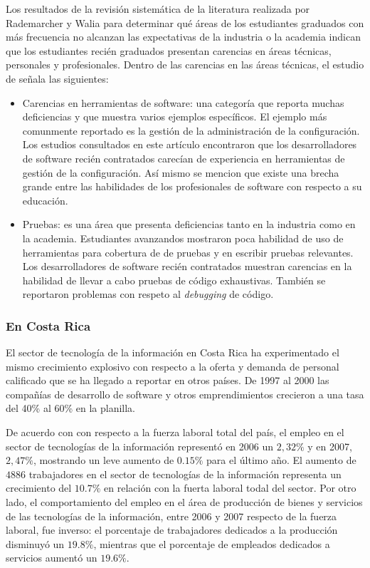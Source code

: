 Los resultados de la revisión sistemática de la literatura realizada por Rademarcher y Walia \cite{radermacher-walia} para determinar qué áreas de los estudiantes graduados con más frecuencia no alcanzan las expectativas de la industria o la academia indican que los estudiantes recién graduados presentan carencias en áreas técnicas, personales y profesionales. Dentro de las carencias en las áreas técnicas, el estudio de \cite{radermacher-walia} señala las siguientes:
\begin{itemize}
    \item Carencias en herramientas de software: una categoría que reporta muchas deficiencias y que muestra varios ejemplos específicos. El ejemplo más comunmente reportado es la gestión de la administración de la configuración. Los estudios consultados en este artículo encontraron que los desarrolladores de software recién contratados carecían de experiencia en herramientas de gestión de la configuración. Así mismo se mencion que existe una brecha grande entre las habilidades de los profesionales de software con respecto a su educación.
    \item Pruebas: es una área que presenta deficiencias tanto en la industria como en la academia. Estudiantes avanzandos mostraron poca habilidad de uso de herramientas para cobertura de de pruebas y en escribir pruebas relevantes. Los desarrolladores de software recién contratados muestran carencias en la habilidad de llevar a cabo pruebas de código exhaustivas. También se reportaron problemas con respeto al \emph{debugging} de código.
\end{itemize}


\subsubsection{En Costa Rica}
El sector de tecnología de la información en Costa Rica ha experimentado el mismo crecimiento explosivo con respecto a la oferta y demanda de personal calificado que se ha llegado a reportar en otros países. De 1997 al 2000 las compañías de desarrollo de software y otros emprendimientos crecieron a una tasa del 40\% al 60\% en la planilla\cite{cenfotec-2}.

De acuerdo con \cite{prosic} con respecto a la fuerza laboral total del país, el empleo en el sector de tecnologías de la información representó en 2006 un $2,32\%$ y en 2007, $2,47\%$, mostrando un leve aumento de $0.15\%$ para el último año. El aumento de $4886$ trabajadores en el sector de tecnologías de la información representa un crecimiento del $10.7\%$ en relación con la fuerta laboral todal del sector. Por otro lado, el comportamiento del empleo en el área de producción de bienes y servicios de las tecnologías de la información, entre 2006 y 2007 respecto de la fuerza laboral, fue inverso: el porcentaje de trabajadores dedicados a la producción disminuyó un $19.8\%$, mientras que el porcentaje de empleados dedicados a servicios aumentó un $19.6\%$.


